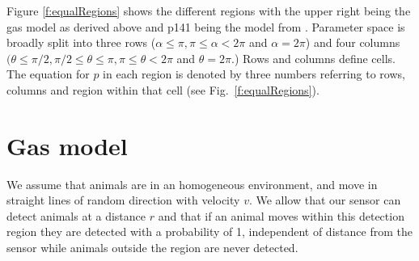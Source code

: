 \begin{comment}
        \begin{itemize}
                \item \ref{p331}: {\bf  p331}
                \item \ref{p332}: {\bf  p332}
                \item \ref{p333}: {\bf  p333}
        \end{itemize}
        \item \ref{p141}: {\bf  p141}
        \item \ref{p24}: {\bf  p24}
        \begin{itemize}
                \item \ref{p241}: {\bf  p241}
                \item \ref{p242}: {\bf  p242}
                \item \ref{p243}: {\bf  p243}
        \end{itemize}
        \item \ref{p34}: {\bf  p34}
        \begin{itemize}
                \item \ref{p341}: {\bf  p341}
                \item \ref{p342}: {\bf  p342}
                \item \ref{p343}: {\bf  p343}
        \end{itemize}
\end{itemize}

\end{comment}

Figure \ref{f:equalRegions} shows the different regions with the upper right being the gas model as derived above and p141 being the model from \citep{rowcliffe2008estimating}. Parameter space is broadly split into three rows ($\alpha \le \pi, \pi \le \alpha < 2\pi$ and $\alpha = 2\pi$) and four columns $(\theta \le \pi/2,  \pi/2 \le \theta \le \pi,  \pi \le \theta < 2\pi$ and $\theta = 2\pi$.) Rows and columns define cells. The equation for $p$ in each region is denoted by three numbers referring to rows, columns and region within that cell (see Fig.~\ref{f:equalRegions}).


\section{Gas model} \label{gas}

We assume that animals are in an homogeneous environment, and move in straight lines of random direction with velocity $v$. We allow that our sensor can detect animals at a distance $r$ and that if an animal moves within this detection region they are detected with a probability of 1, independent of distance from the sensor while animals outside the region are never detected.

